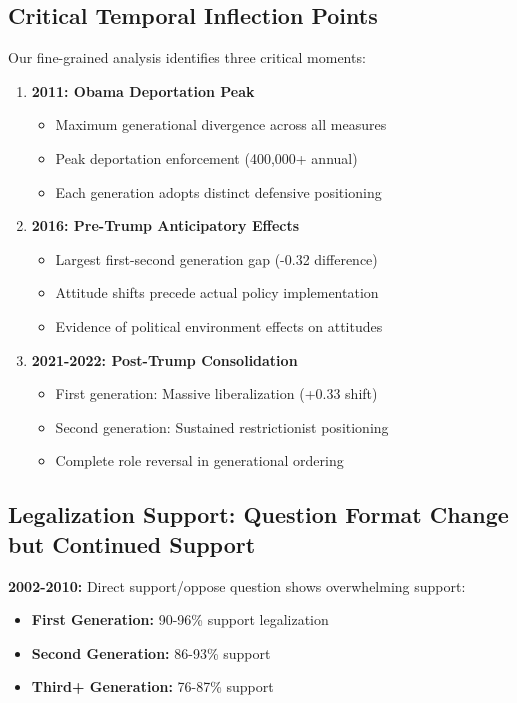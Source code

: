 \documentclass[11pt,letterpaper]{article}
\newcommand{\compactdesc}[2]{\item \textbf{#1:} #2}
\begin{document}
\subsection{Critical Temporal Inflection Points}

Our fine-grained analysis identifies three critical moments:

\begin{enumerate}
    \item \textbf{2011: Obama Deportation Peak}
        \begin{itemize}
            \item Maximum generational divergence across all measures
            \item Peak deportation enforcement (400,000+ annual)
            \item Each generation adopts distinct defensive positioning
        \end{itemize}
        
    \item \textbf{2016: Pre-Trump Anticipatory Effects}
        \begin{itemize}
            \item Largest first-second generation gap (-0.32 difference)
            \item Attitude shifts precede actual policy implementation
            \item Evidence of political environment effects on attitudes
        \end{itemize}
        
    \item \textbf{2021-2022: Post-Trump Consolidation}
        \begin{itemize}
            \item First generation: Massive liberalization (+0.33 shift)
            \item Second generation: Sustained restrictionist positioning
            \item Complete role reversal in generational ordering
        \end{itemize}
\end{enumerate}

\subsection{Legalization Support: Question Format Change but Continued Support}

\textbf{2002-2010:} Direct support/oppose question shows overwhelming support:
\begin{itemize}
    \compactdesc{First Generation}{90-96\% support legalization}
    \compactdesc{Second Generation}{86-93\% support}
    \compactdesc{Third+ Generation}{76-87\% support}
\end{itemize}
\end{document}
